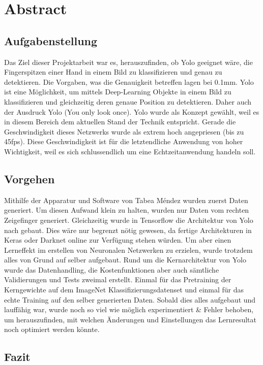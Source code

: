 \newpage
\section*{Abstract}
\subsection*{Aufgabenstellung}
Das Ziel dieser Projektarbeit war es, herauszufinden, ob Yolo geeignet wäre, die Fingerspitzen einer Hand in einem Bild zu klassifizieren und genau zu detektieren. 
Die Vorgaben, was die Genauigkeit betreffen lagen bei 0.1mm.
Yolo ist eine Möglichkeit, um mittels Deep-Learning Objekte in einem Bild zu klassifizieren und gleichzeitig deren genaue Position zu detektieren. 
Daher auch der Ausdruck Yolo (You only look once).
Yolo wurde als Konzept gewählt, weil es in diesem Bereich dem aktuellen Stand der Technik entspricht. 
Gerade die Geschwindigkeit dieses Netzwerks wurde als extrem hoch angepriesen (bis zu 45fps).
Diese Geschwindigkeit ist für die letztendliche Anwendung von hoher Wichtigkeit, weil es sich schlussendlich um eine Echtzeitanwendung handeln soll. 

\subsection*{Vorgehen}
Mithilfe der Apparatur und Software von Tabea Méndez \cite{TabeasFingertracking} wurden zuerst Daten generiert.
Um diesen Aufwand klein zu halten, wurden nur Daten vom rechten Zeigefinger generiert. 
Gleichzeitig wurde in Tensorflow die Architektur von Yolo nach gebaut. 
Dies wäre nur begrenzt nötig gewesen, da fertige Architekturen in Keras oder Darknet online zur Verfügung stehen würden. 
Um aber einen Lerneffekt im erstellen von Neuronalen Netzwerken zu erzielen, wurde trotzdem alles von Grund auf selber aufgebaut. 
Rund um die Kernarchitektur von Yolo wurde das Datenhandling, die Kostenfunktionen aber auch sämtliche Validierungen und Tests zweimal erstellt.  
Einmal für das Pretraining der Kerngewichte auf dem ImageNet Klassifizierungsdatenset und einmal für das \grqq{}echte\grqq{} Training auf den selber generierten Daten. 
Sobald dies alles aufgebaut und lauffähig war, wurde noch so viel wie möglich experimentiert \& Fehler behoben, um herauszufinden, mit welchen Änderungen und Einstellungen das Lernresultat noch optimiert werden könnte.    

\subsection*{Fazit}

